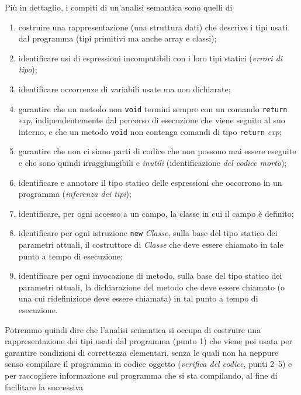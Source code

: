Pi\`u in dettaglio, i compiti di un'analisi semantica sono quelli di
%
\begin{enumerate}
\item costruire una rappresentazione (una struttura dati) che descrive
      i tipi usati dal programma (tipi primitivi ma anche array e classi);
\item identificare usi di espressioni incompatibili con i loro tipi statici
      (\emph{errori di tipo});
\item identificare occorrenze di variabili usate ma non dichiarate;
\item garantire che un metodo non \texttt{void} termini sempre con
      un comando \texttt{return} \textit{exp},
      indipendentemente dal percorso di
      esecuzione che viene seguito al suo interno, e che un metodo
      \texttt{void} non contenga comandi di tipo \texttt{return} \textit{exp};
\item garantire che non ci siano parti di codice che non possono mai
      essere eseguite e che sono quindi irraggiungibili e \emph{inutili}
      (identificazione \emph{del codice morto});
\item identificare e annotare il tipo statico delle espressioni che occorrono
      in un programma (\emph{inferenza dei tipi});
\item identificare, per ogni accesso a un campo, la classe in cui il campo
      \`e definito;
\item identificare per ogni istruzione \texttt{new} \textit{Classe},
      sulla base del tipo statico dei parametri attuali,
      il costruttore di \textit{Classe}
      che deve essere chiamato in tale punto a tempo di esecuzione;
\item identificare per ogni invocazione di metodo, sulla base del tipo statico
      dei parametri attuali, la dichiarazione del metodo
      che deve essere chiamato (o una cui ridefinizione deve essere chiamata)
      in tal punto a tempo di esecuzione.
\end{enumerate}
%
Potremmo quindi dire che l'analisi semantica si occupa di
costruire una rappresentazione dei tipi usati dal programma (punto 1)
che viene poi usata per garantire condizioni
di correttezza elementari, senza le quali non ha neppure senso compilare
il programma in codice oggetto (\emph{verifica del codice},
punti 2--5) e per raccogliere informazione
sul programma che si sta compilando, al fine di facilitare la successiva
